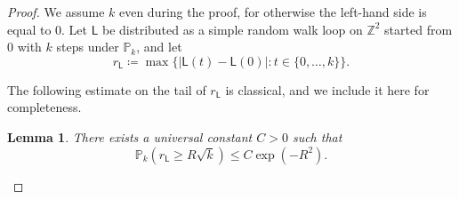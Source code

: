 \documentclass[11pt]{article}
\newtheorem{lemma}[theorem]{Lemma}
\begin{document}
\begin{proof}
    We assume $k$ even during the proof, for otherwise the left-hand side is equal to $0$.
    Let $\mathsf{L}$ be distributed as a simple random walk loop on $\mathbb{Z}^2$ started from $0$ with $k$ steps under $\mathbb{P}_{k}$, and let
    \[r_\mathsf{L}\coloneqq \max \{ |\mathsf{L}(t)-\mathsf{L}(0)|:   t\in \{0,\dots, k\} \}.\]
    
    
    The following estimate on the tail of $r_\mathsf{L}$ is classical, and we include it here for completeness. 
    
    
\begin{lemma}\label{L:ex_hoeffding} There exists a universal constant $C>0$ such that 
    \begin{equation} 
    \label{eq:temp:hoef}
    \mathbb{P}_k( r_{\mathsf{L}} \geq R \sqrt{k} ) \leq C \exp(-R^2).
    \end{equation}
\end{lemma}


\end{proof}
\end{document}

